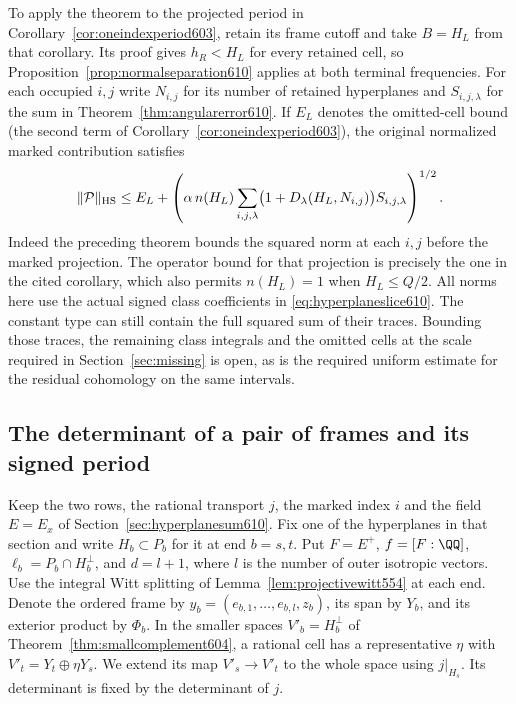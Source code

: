 \documentclass[a4paper,11pt]{article}
\theoremstyle{definition}
\theoremstyle{remark}
\numberwithin{equation}{section}
\begin{document}
To apply the theorem to the projected period in
Corollary~\ref{cor:oneindexperiod603}, retain its frame cutoff and
take \(B=H_L\) from that corollary. Its proof gives \(h_R<H_L\)
for every retained cell, so Proposition~\ref{prop:normalseparation610}
applies at both terminal frequencies. For each occupied \(i,j\)
write \(N_{i,j}\) for its number of retained hyperplanes and
\(S_{i,j,\lambda}\) for the sum in Theorem~\ref{thm:angularerror610}.
If \(E_L\) denotes the omitted-cell bound (the second term of
Corollary~\ref{cor:oneindexperiod603}), the original normalized
marked contribution satisfies
\[
 \|\mathcal P\|_{\rm HS}\le E_L+
  \left(\alpha\,n(H_L)
    \sum_{i,j,\lambda}\bigl(1+D_\lambda(H_L,N_{i,j})\bigr)
                              S_{i,j,\lambda}\right)^{1/2}.
\]
Indeed the preceding theorem bounds the squared norm at each
\(i,j\) before the marked projection. The operator bound for
that projection is precisely the one in the cited corollary,
which also permits \(n(H_L)=1\) when \(H_L\le Q/2\).
All norms here use the actual signed class coefficients in
\eqref{eq:hyperplaneslice610}. The constant type can still
contain the full squared sum of their traces. Bounding those
traces, the remaining class integrals and the omitted cells at
the scale required in Section~\ref{sec:missing} is open, as is
the required uniform estimate for the residual cohomology on
the same intervals.


\subsection{The determinant of a pair of frames and its signed period}
\label{sec:frameorientation611}

Keep the two rows, the rational transport \(j\), the marked index
\(i\) and the field \(E=E_x\) of Section~\ref{sec:hyperplanesum610}.
Fix one of the hyperplanes in that section and write \(H_b\subset
P_b\) for it at end \(b=s,t\). Put \(F=E^+\), \(f=[F:\QQ]\),
\(\ell_b=P_b\cap H_b^\perp\), and \(d=l+1\), where \(l\) is the
number of outer isotropic vectors. Use the integral Witt splitting
of Lemma~\ref{lem:projectivewitt554} at each end. Denote the
ordered frame by \(y_b=(e_{b,1},\ldots,e_{b,l},z_b)\), its span by
\(Y_b\), and its exterior product by \(\Phi_b\). In the smaller
spaces \(V'_b=H_b^\perp\) of Theorem~\ref{thm:smallcomplement604},
a rational cell has a representative \(\eta\) with
\(V'_t=Y_t\oplus\eta Y_s\). We extend its map \(V'_s\to V'_t\)
to the whole space using \(j|_{H_s}\). Its determinant is fixed by
the determinant of \(j\).
\end{document}
